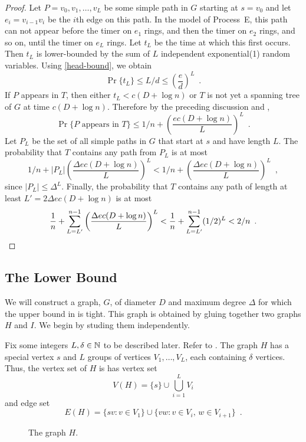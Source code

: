 \documentclass{patmorin}
\begin{document}
\begin{proof}
  Let $P=v_0,v_1,\ldots,v_L$ be some simple path in $G$ starting at
  $s=v_0$ and let $e_i=v_{i-1}v_i$ be the $i$th edge on this path.
  In the model of Process~E, this path can not appear before the timer
  on $e_1$ rings, and then the timer on $e_2$ rings, and so on, until the
  timer on $e_L$ rings.  Let $t_L$ be the time at which this first occurs.
  Then $t_L$ is lower-bounded by the sum of $L$ independent exponential(1)
  random variables.  Using \eqref{head-bound}, we obtain
  \[
      \Pr\{t_L\} \le L/d \le \left(\frac{e}{d}\right)^L \enspace .
  \]
  If $P$ appears in $T$, then either $t_L < c(D+\log n)$ or $T$ is not
  yet a spanning tree of $G$ at time $c(D+\log n)$.  
  Therefore by the preceding discussion and , 
  \[
      \Pr\{\text{$P$ appears in $T$}\} \le 1/n 
        + \left(\frac{ec(D+\log n)}{L}\right)^L \enspace .
  \]
  Let $P_L$ be the set of all simple paths in $G$ that start at $s$ and have length $L$.  The probability that $T$ contains any path from $P_L$ is at most
  \[
      1/n + |P_L|\left(\frac{\Delta ec(D+\log n)}{L}\right)^L 
      < 1/n + \left(\frac{\Delta ec(D+\log n)}{L}\right)^L \enspace ,
  \]
  since $|P_L|\le \Delta^L$.
  Finally, the probability that $T$ contains any path of length at least
  $L'=2\Delta ec(D+\log n)$ is at most
  \[
     \frac{1}{n}+\sum_{L=L'}^{n-1} \left(\frac{\Delta ec(D+\log n)}{L}\right)^L <  \frac{1}{n}+\sum_{L=L'}^{n-1} (1/2)^L < 2/n \enspace . \qedhere
  \]
\end{proof}


\subsection{The Lower Bound}

We will construct a graph, $G$, of diameter $D$ and maximum degree
$\Delta$ for which the upper bound in  is tight.  This graph is
obtained by gluing together two graphs $H$ and $I$. We begin by studing
them independently.

Fix some integers $L,\delta\in\mathbb{N}$ to be described later.  Refer to
.  The graph $H$ has a special vertex $s$ and $L$ groups of
vertices $V_1,\ldots,V_L$, each containing $\delta$ vertices.  Thus,
the vertex set of $H$ is has vertex set
\[
   V(H) = \{s\}\cup\bigcup_{i=1}^L V_i
\]
and edge set
\[
   E(H) = \{sv : v\in V_1\}
       \cup \{vw : v\in V_{i},\, w\in V_{i+1}\} \enspace .
\]
\begin{figure}
   \caption{The graph $H$.}
\end{figure}
\end{document}
